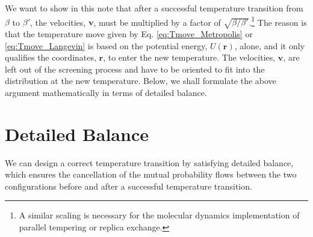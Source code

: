 \documentclass[11pt]{article}
\begin{document}
We want to show in this note that after a successful
temperature transition from $\beta$ to $\beta'$,
the velocities, $\mathbf v$, must be multiplied by
a factor of $\sqrt{ \beta / \beta' }$.\footnote{
A similar scaling is necessary for
the molecular dynamics implementation of
parallel tempering or replica exchange\cite{sugita1999}.}
%
The reason is that the temperature move
given by Eq. \eqref{eq:Tmove_Metropolis}
or \eqref{eq:Tmove_Langevin}
is based on the potential energy, $U(\mathbf r)$, alone,
%
and it only qualifies the coordinates, $\mathbf r$,
to enter the new temperature.
%
The velocities, $\mathbf v$, are left out of
the screening process
and have to be oriented to fit into
the distribution at the new temperature.
%
Below, we shall formulate the above argument
mathematically in terms of detailed balance.
%


\section{Detailed Balance}


We can design a correct temperature transition
by satisfying detailed balance,
which ensures the cancellation
of the mutual probability flows between
the two configurations before and after
a successful temperature transition.
\end{document}
